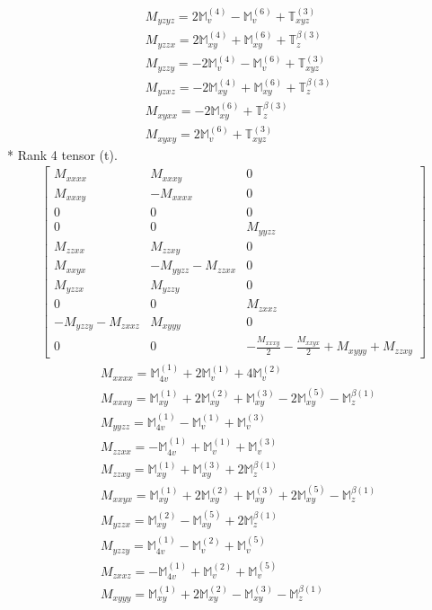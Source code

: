 \documentclass[fleqn,8pt,landscape]{jsarticle}
\begin{document}
\begin{align*}
& M_{yzyz} = 2 \mathbb{M}_{v}^{(4)} - \mathbb{M}_{v}^{(6)} + \mathbb{T}_{xyz}^{(3)} \\
& M_{yzzx} = 2 \mathbb{M}_{xy}^{(4)} + \mathbb{M}_{xy}^{(6)} + \mathbb{T}_{z}^{\beta(3)} \\
& M_{yzzy} = - 2 \mathbb{M}_{v}^{(4)} - \mathbb{M}_{v}^{(6)} + \mathbb{T}_{xyz}^{(3)} \\
& M_{yzxz} = - 2 \mathbb{M}_{xy}^{(4)} + \mathbb{M}_{xy}^{(6)} + \mathbb{T}_{z}^{\beta(3)} \\
& M_{xyxx} = - 2 \mathbb{M}_{xy}^{(6)} + \mathbb{T}_{z}^{\beta(3)} \\
& M_{xyxy} = 2 \mathbb{M}_{v}^{(6)} + \mathbb{T}_{xyz}^{(3)}
\end{align*}
* Rank 4 tensor (t).
\begin{align*}
\begin{bmatrix} M_{xxxx} & M_{xxxy} & 0 \\ M_{xxxy} & - M_{xxxx} & 0 \\ 0 & 0 & 0 \\ 0 & 0 & M_{yyzz} \\ M_{zzxx} & M_{zzxy} & 0 \\ M_{xxyx} & - M_{yyzz} - M_{zzxx} & 0 \\ M_{yzzx} & M_{yzzy} & 0 \\ 0 & 0 & M_{zxxz} \\ - M_{yzzy} - M_{zxxz} & M_{xyyy} & 0 \\ 0 & 0 & - \frac{M_{xxxy}}{2} - \frac{M_{xxyx}}{2} + M_{xyyy} + M_{zzxy} \end{bmatrix}
\end{align*}
\begin{align*}
& M_{xxxx} = \mathbb{M}_{4v}^{(1)} + 2 \mathbb{M}_{v}^{(1)} + 4 \mathbb{M}_{v}^{(2)} \\
& M_{xxxy} = \mathbb{M}_{xy}^{(1)} + 2 \mathbb{M}_{xy}^{(2)} + \mathbb{M}_{xy}^{(3)} - 2 \mathbb{M}_{xy}^{(5)} - \mathbb{M}_{z}^{\beta(1)} \\
& M_{yyzz} = \mathbb{M}_{4v}^{(1)} - \mathbb{M}_{v}^{(1)} + \mathbb{M}_{v}^{(3)} \\
& M_{zzxx} = - \mathbb{M}_{4v}^{(1)} + \mathbb{M}_{v}^{(1)} + \mathbb{M}_{v}^{(3)} \\
& M_{zzxy} = \mathbb{M}_{xy}^{(1)} + \mathbb{M}_{xy}^{(3)} + 2 \mathbb{M}_{z}^{\beta(1)} \\
& M_{xxyx} = \mathbb{M}_{xy}^{(1)} + 2 \mathbb{M}_{xy}^{(2)} + \mathbb{M}_{xy}^{(3)} + 2 \mathbb{M}_{xy}^{(5)} - \mathbb{M}_{z}^{\beta(1)} \\
& M_{yzzx} = \mathbb{M}_{xy}^{(2)} - \mathbb{M}_{xy}^{(5)} + 2 \mathbb{M}_{z}^{\beta(1)} \\
& M_{yzzy} = \mathbb{M}_{4v}^{(1)} - \mathbb{M}_{v}^{(2)} + \mathbb{M}_{v}^{(5)} \\
& M_{zxxz} = - \mathbb{M}_{4v}^{(1)} + \mathbb{M}_{v}^{(2)} + \mathbb{M}_{v}^{(5)} \\
& M_{xyyy} = \mathbb{M}_{xy}^{(1)} + 2 \mathbb{M}_{xy}^{(2)} - \mathbb{M}_{xy}^{(3)} - \mathbb{M}_{z}^{\beta(1)}
\end{align*}
\end{document}
